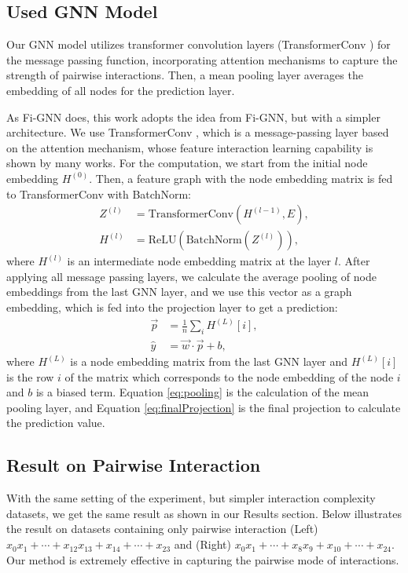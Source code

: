 \documentclass[10pt,a4paper]{article}
\begin{document}
\subsection{Used GNN Model}
Our GNN model utilizes transformer convolution layers (TransformerConv \cite{TransformerConv}) for the message passing function, incorporating attention mechanisms to capture the strength of pairwise interactions. Then, a mean pooling layer averages the embedding of all nodes for the prediction layer.

As Fi-GNN does, this work adopts the idea from Fi-GNN, but with a simpler architecture. We use TransformerConv \cite{TransformerConv}, which is a message-passing layer based on the attention mechanism, whose feature interaction learning capability is shown by many works. For the computation, we start from the initial node embedding $H^{(0)}$. Then, a feature graph with the node embedding matrix is fed to TransformerConv with BatchNorm:
\begin{equation} \label{eq:transformerConv}
\begin{split}
    Z^{(l)} &= \text{TransformerConv}(H^{(l-1)},E),\\
    H^{(l)} &= \text{ReLU}(\text{BatchNorm}(Z^{(l)})),
\end{split}
\end{equation}
where $H^{(l)}$ is an intermediate node embedding matrix at the layer $l$. After applying all message passing layers, we calculate the average pooling of node embeddings from the last GNN layer, and we use this vector as a graph embedding, which is fed into the projection layer to get a prediction:
\begin{align} 
    \vec{p} &= \frac{1}{n}\sum_{i}H^{(L)}[i],\label{eq:pooling}\\
    \hat{y}  &= \vec{w}\cdot \vec{p} + b,\label{eq:finalProjection}
\end{align}
where $H^{(L)}$ is a node embedding matrix from the last GNN layer and $H^{(L)}[i]$ is the row $i$ of the matrix which corresponds to the node embedding of the node $i$ and $b$ is a biased term. Equation \ref{eq:pooling} is the calculation of the mean pooling layer, and Equation \ref{eq:finalProjection} is the final projection to calculate the prediction value.

\subsection{Result on Pairwise Interaction}
With the same setting of the experiment, but simpler interaction complexity datasets, we get the same result as shown in our Results section.
Below illustrates the result on datasets containing only pairwise interaction (Left) $x_0x_1 + \cdots + x_{12}x_{13} + x_{14} + \cdots + x_{23}$ and (Right) $x_0x_1 + \cdots + x_{8}x_{9} + x_{10} + \cdots + x_{24}$. Our method is extremely effective in capturing the pairwise mode of interactions.
\end{document}
